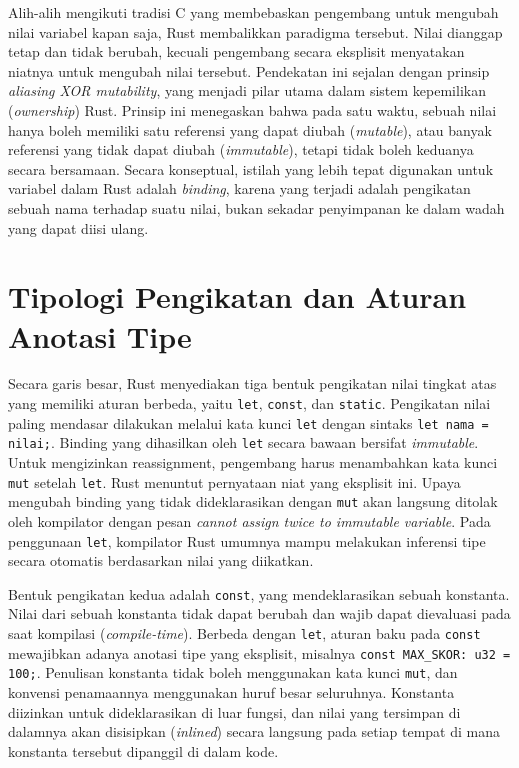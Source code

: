 \documentclass[11pt,a4paper]{article}
\begin{document}
Alih-alih mengikuti tradisi C yang membebaskan pengembang untuk mengubah nilai variabel kapan saja, Rust membalikkan paradigma tersebut. Nilai dianggap tetap dan tidak berubah, kecuali pengembang secara eksplisit menyatakan niatnya untuk mengubah nilai tersebut. Pendekatan ini sejalan dengan prinsip \textit{aliasing XOR mutability}, yang menjadi pilar utama dalam sistem kepemilikan (\textit{ownership}) Rust. Prinsip ini menegaskan bahwa pada satu waktu, sebuah nilai hanya boleh memiliki satu referensi yang dapat diubah (\textit{mutable}), atau banyak referensi yang tidak dapat diubah (\textit{immutable}), tetapi tidak boleh keduanya secara bersamaan. Secara konseptual, istilah yang lebih tepat digunakan untuk variabel dalam Rust adalah \textit{binding}, karena yang terjadi adalah pengikatan sebuah nama terhadap suatu nilai, bukan sekadar penyimpanan ke dalam wadah yang dapat diisi ulang.

\section{Tipologi Pengikatan dan Aturan Anotasi Tipe}

Secara garis besar, Rust menyediakan tiga bentuk pengikatan nilai tingkat atas yang memiliki aturan berbeda, yaitu \texttt{let}, \texttt{const}, dan \texttt{static}. Pengikatan nilai paling mendasar dilakukan melalui kata kunci \texttt{let} dengan sintaks \texttt{let nama = nilai;}. Binding yang dihasilkan oleh \texttt{let} secara bawaan bersifat \textit{immutable}. Untuk mengizinkan reassignment, pengembang harus menambahkan kata kunci \texttt{mut} setelah \texttt{let}. Rust menuntut pernyataan niat yang eksplisit ini. Upaya mengubah binding yang tidak dideklarasikan dengan \texttt{mut} akan langsung ditolak oleh kompilator dengan pesan \textit{cannot assign twice to immutable variable}. Pada penggunaan \texttt{let}, kompilator Rust umumnya mampu melakukan inferensi tipe secara otomatis berdasarkan nilai yang diikatkan.

Bentuk pengikatan kedua adalah \texttt{const}, yang mendeklarasikan sebuah konstanta. Nilai dari sebuah konstanta tidak dapat berubah dan wajib dapat dievaluasi pada saat kompilasi (\textit{compile-time}). Berbeda dengan \texttt{let}, aturan baku pada \texttt{const} mewajibkan adanya anotasi tipe yang eksplisit, misalnya \texttt{const MAX\_SKOR: u32 = 100;}. Penulisan konstanta tidak boleh menggunakan kata kunci \texttt{mut}, dan konvensi penamaannya menggunakan huruf besar seluruhnya. Konstanta diizinkan untuk dideklarasikan di luar fungsi, dan nilai yang tersimpan di dalamnya akan disisipkan (\textit{inlined}) secara langsung pada setiap tempat di mana konstanta tersebut dipanggil di dalam kode.
\end{document}
